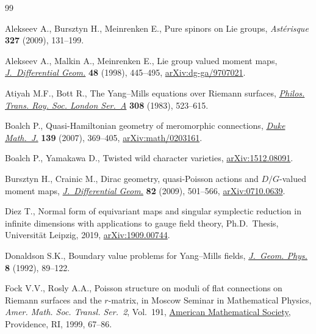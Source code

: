 \documentclass[10pt,a4paper]{amsart}
\numberwithin{equation}{section}
\theoremstyle{definition}
\begin{document}
\begin{thebibliography}{99}
\footnotesize\itemsep=0pt

Alekseev A., Bursztyn H., Meinrenken E., Pure spinors on {L}ie groups,
 \textit{Ast\'{e}risque} \textbf{327} (2009), 131--199.

Alekseev A., Malkin A., Meinrenken E., Lie group valued moment maps,
 \href{https://doi.org/10.4310/jdg/1214460860}{\textit{J.~Differential Geom.}}
 \textbf{48} (1998), 445--495,
 \href{https://arxiv.org/abs/dg-ga/9707021}{arXiv:dg-ga/9707021}.

Atiyah M.F., Bott R., The {Y}ang--{M}ills equations over {R}iemann surfaces,
 \href{https://doi.org/10.1098/rsta.1983.0017}{\textit{Philos. Trans. Roy.
 Soc. London Ser.~A}} \textbf{308} (1983), 523--615.

Boalch P., Quasi-{H}amiltonian geometry of meromorphic connections,
 \href{https://doi.org/10.1215/S0012-7094-07-13924-3}{\textit{Duke Math.~J.}}
 \textbf{139} (2007), 369--405,
 \href{https://arxiv.org/abs/math/0203161}{arXiv:math/0203161}.

Boalch P., Yamakawa D., Twisted wild character varieties,
 \href{https://arxiv.org/abs/1512.08091}{arXiv:1512.08091}.

Bursztyn H., Crainic M., Dirac geometry, quasi-{P}oisson actions and
 {$D/G$}-valued moment maps,
 \href{https://doi.org/10.4310/jdg/1251122545}{\textit{J.~Differential Geom.}}
 \textbf{82} (2009), 501--566,
 \href{https://arxiv.org/abs/0710.0639}{arXiv:0710.0639}.

Diez T., Normal form of equivariant maps and singular symplectic reduction in
 infinite dimensions with applications to gauge field theory, Ph.D.~Thesis,
 {U}niversit\"at {L}eipzig, 2019,
 \href{https://arxiv.org/abs/1909.00744}{arXiv:1909.00744}.

Donaldson S.K., Boundary value problems for {Y}ang--{M}ills fields,
 \href{https://doi.org/10.1016/0393-0440(92)90044-2}{\textit{J.~Geom. Phys.}}
 \textbf{8} (1992), 89--122.

Fock V.V., Rosly A.A., Poisson structure on moduli of flat connections on
 {R}iemann surfaces and the {$r$}-matrix, in Moscow {S}eminar in
 {M}athematical {P}hysics, \textit{Amer. Math. Soc. Transl. Ser.~2}, Vol.~191,
 \href{https://doi.org/10.1090/trans2/191/03}{American Mathematical Society},
 Providence, RI, 1999, 67--86.


\end{thebibliography}
\end{document}
